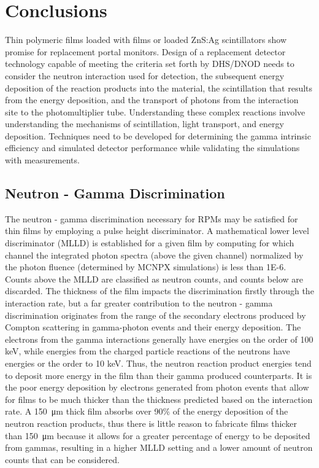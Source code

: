 \chapter{Conclusions}
\label{chap:Conclusions}
Thin polymeric films loaded with  films or  loaded ZnS:Ag scintillators show promise for replacement portal monitors. 
Design of a replacement detector technology capable of meeting the criteria  set forth by DHS/DNOD needs to consider the neutron interaction used for detection, the subsequent energy deposition  of the reaction products into the material, the scintillation that results from the energy deposition, and the transport of photons from the interaction site to the photomultiplier tube.
Understanding these complex reactions involve understanding the mechanisms of scintillation, light transport, and energy deposition.
Techniques need to be developed for determining the gamma intrinsic efficiency and simulated detector performance while validating the simulations with measurements.

\section{Neutron - Gamma Discrimination}
The neutron - gamma discrimination necessary for RPMs may be satisfied for thin films by employing a pulse height discriminator.
A mathematical lower level discriminator (MLLD) is established for a given film by computing for which channel the integrated photon spectra (above the given channel) normalized by the photon fluence (determined by MCNPX simulations) is less than \num{1E-6}.
Counts above the MLLD are classified as neutron counts, and counts below are discarded.
The thickness of the film impacts the discrimination firstly through the interaction rate, but a far greater contribution to the neutron - gamma discrimination originates from the range of the secondary electrons produced by Compton scattering in gamma-photon events and their energy deposition.
The electrons from the gamma interactions generally have energies on the order of 100 keV, while energies from the charged particle reactions of the neutrons have energies or the order to 10 keV.
Thus, the neutron reaction product energies tend to deposit more energy in the film than their gamma produced counterparts.
It is the poor energy deposition by electrons generated from photon events that allow for films to be much thicker than the thickness predicted based on the interaction rate.
A \SI{150}{\um} thick film absorbs over 90\% of the energy deposition of the neutron reaction products, thus there is little reason to fabricate films thicker than \SI{150}{\um} because it allows for a greater percentage of energy to be deposited from gammas, resulting in a higher MLLD setting and a lower amount of neutron counts that can be considered.


